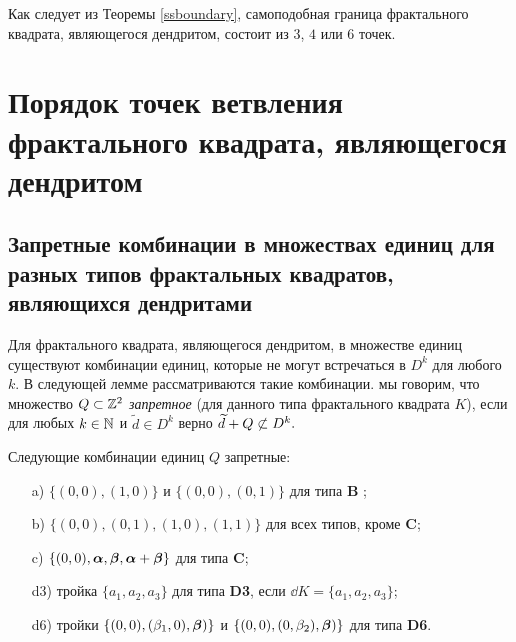 Как следует из Теоремы \ref{ssboundary}, самоподобная граница фрактального квадрата, являющегося дендритом, состоит из $3$, $4$ или $6$ точек.





\section{Порядок точек ветвления фрактального квадрата, являющегося дендритом}

\subsection{Запретные комбинации в множествах единиц для разных типов фрактальных квадратов, являющихся дендритами}

Для фрактального квадрата, являющегося дендритом, в множестве единиц существуют комбинации единиц, которые не могут встречаться в $D^k$ для любого $k$. 
В следующей лемме рассматриваются такие комбинации. 
мы говорим, что множество $Q\subset \mathbb{Z}^2$ {\em  запретное} (для данного типа фрактального квадрата $K$), если для любых $k\in\mathbb{N}$ и $\widetilde d\in D^k$ верно
$\widetilde d+Q\not\subset D^k.$

\begin{lemma}\label{quadruples}
Следующие комбинации единиц $Q$ запретные:
\begin{itemize}[nolistsep]
\item[a)] $\{(0,0), (1,0)\} $ и $\{(0,0), (0,1)\} $ для типа {\bf B} ;
\item[b)] $\{(0,0), (0,1), (1,0), (1,1)\}$ для всех типов, кроме {\bf C};
\item[c)] $\{(0,0),{\bm{\alpha}},{\bm{\beta}},{\bm{\alpha}}+{\bm{\beta}}\}$ для типа {\bf C};
\item[d3)] тройка $\{a_1, a_2, a_3\}$ для типа {\bf D3}, если $\dd K=\{a_1,a_2, a_3\}$;
\item[d6)] тройки $\{(0,0),(\beta_1,0),{\bm{\beta}})\}$ и $\{(0,0),(0,\beta_2),{\bm{\beta}})\}$ для типа {\bf D6}. 
\end{itemize}
\end{lemma}

